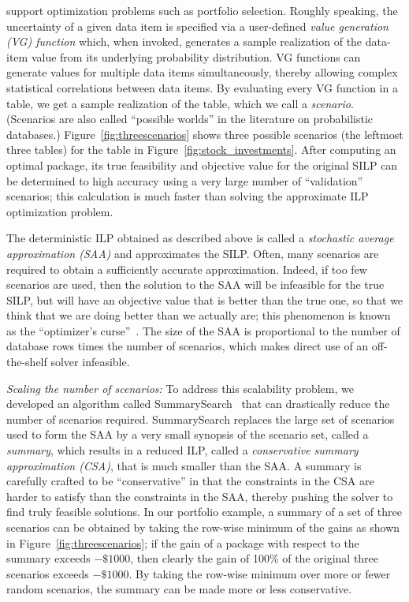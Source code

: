 \documentclass[11pt]{article}
\newcommand{\subsearch}{{\sc SummarySearch}\xspace}
\begin{document}
support optimization problems such as portfolio selection. Roughly speaking, the uncertainty of a given data item is specified via a user-defined \emph{value generation (VG) function} which, when invoked, generates a sample realization of the data-item value from its underlying probability distribution. VG functions can generate values for multiple data items simultaneously, thereby allowing complex statistical correlations between data items. By evaluating every VG function in a table, we get a sample realization of the table, which we call a \emph{scenario}. (Scenarios are also called ``possible worlds'' in the literature on probabilistic databases.) Figure~\ref{fig:threescenarios} shows three possible scenarios (the leftmost three tables) for the table in Figure~\ref{fig:stock_investments}. After computing an optimal package, its true feasibility and objective value for the original SILP can be determined to high accuracy using a very large number of ``validation'' scenarios; this calculation is much faster than solving the approximate ILP optimization problem.

The deterministic ILP obtained as described above is called a \emph{stochastic average approximation (SAA)} and approximates the SILP. Often, many scenarios are required to obtain a sufficiently accurate approximation. Indeed, if too few scenarios are used, then the solution to the SAA will be infeasible for the true SILP, but will have an objective value that is better than the true one, so that we think that we are doing better than we actually are; this phenomenon is known as the ``optimizer's curse''~\cite{smith2006optimizer}. The size of the SAA is proportional to the number of database rows times the number of scenarios, which makes direct use of an off-the-shelf solver infeasible.

\smallskip\textit{Scaling the number of scenarios:} To address this scalability problem, we developed an algorithm called \subsearch~\cite{BrucatoAHM2020} that can drastically reduce the number of scenarios required. \subsearch replaces the large set of scenarios used to form the SAA by a very small synopsis of the scenario set, called a \emph{summary}, which results in a reduced ILP, called a \emph{conservative summary approximation (CSA)}, that is much smaller than the SAA. A summary is carefully crafted to be ``conservative'' in that the constraints in the CSA are harder to satisfy than the constraints in the SAA, thereby pushing the solver to find truly feasible solutions. In our portfolio example, a summary of a set of three scenarios can be obtained by taking the row-wise minimum of the gains as shown in Figure~\ref{fig:threescenarios}; if the gain of a package with respect to the summary exceeds $-\$1000$, then clearly the gain of 100\% of the original three scenarios exceeds $-\$1000$. By taking the row-wise minimum over more or fewer random scenarios, the summary can be made more or less conservative.
\end{document}
